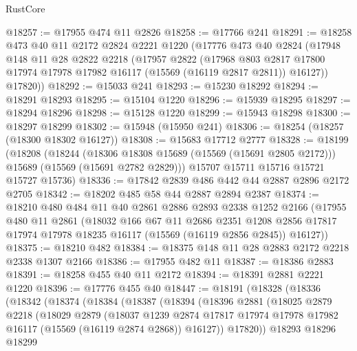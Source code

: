 \begin{lexlean}{RustCore}
\begin{coremodule}
@18257 := @17955 @474 @11 @2826
@18258 := @17766 @241
@18291 := @18258
    @473
    @40
    @11
    @2172
    @2824
    @2221
    @1220
    (@17776
      @473
      @40
      @2824
      (@17948
        @148
        @11
        @28
        @2822
        @2218
        (@17957
          @2822
          (@17968
            @803
            @2817
            @17800
            @17974
            @17978
            @17982
            @16117
            (@15569 (@16119 @2817 @2811))
            @16127))
        @17820))
@18292 := @15033 @241
@18293 := @15230 @18292
@18294 := @18291 @18293
@18295 := @15104 @1220
@18296 := @15939 @18295
@18297 := @18294 @18296
@18298 := @15128 @1220
@18299 := @15943 @18298
@18300 := @18297 @18299
@18302 := @15948 (@15950 @241)
@18306 := @18254 (@18257 (@18300 @18302 @16127))
@18308 := @15683 @17712 @2777
@18328 := @18199
    (@18208
      (@18244
        (@18306 @18308 @15689 (@15569 (@15691 @2805 @2172)))
        @15689
        (@15569 (@15691 @2782 @2829)))
      @15707
      @15711
      @15716
      @15721
      @15727
      @15736)
@18336 := @17842 @2839 @486 @442 @44 @2887 @2896 @2172 @2705
@18342 := @18202 @485 @58 @44 @2887 @2894 @2387
@18374 := @18210
    @480
    @484
    @11
    @40
    @2861
    @2886
    @2893
    @2338
    @1252
    @2166
    (@17955
      @480
      @11
      @2861
      (@18032
        @166
        @67
        @11
        @2686
        @2351
        @1208
        @2856
        @17817
        @17974
        @17978
        @18235
        @16117
        (@15569 (@16119 @2856 @2845))
        @16127))
@18375 := @18210 @482
@18384 := @18375 @148 @11 @28 @2883 @2172 @2218 @2338 @1307 @2166
@18386 := @17955 @482 @11
@18387 := @18386 @2883
@18391 := @18258 @455 @40 @11 @2172
@18394 := @18391 @2881 @2221 @1220
@18396 := @17776 @455 @40
@18447 := @18191
    (@18328
      (@18336
        (@18342
          (@18374
            (@18384
              (@18387
                (@18394
                  (@18396
                    @2881
                    (@18025
                      @2879
                      @2218
                      (@18029
                        @2879
                        (@18037
                          @1239
                          @2874
                          @17817
                          @17974
                          @17978
                          @17982
                          @16117
                          (@15569 (@16119 @2874 @2868))
                          @16127))
                      @17820))
                  @18293
                  @18296
                  @18299

\end{coremodule}
\end{lexlean}
